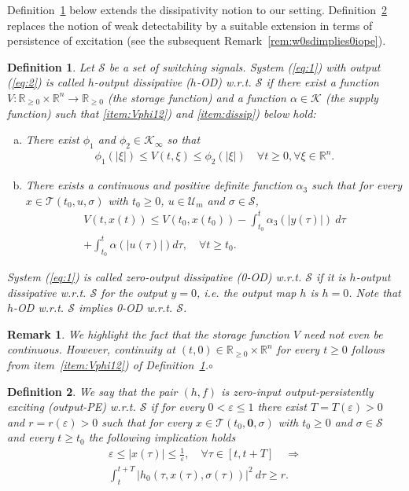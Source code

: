 \documentclass[9pt,final,journal]{IEEEtran}
\newtheorem{defin}{Definition}
\newtheorem{remark}{Remark}
\def\K{\mathcal{K}}
\def\Ki{\K_{\infty}}
\def\R{\mathbb{R}}
\def\S{\mathcal{S}}
\def\T{\mathcal{T}}
\def\U{\mathcal{U}}
\def\mer{\hfill $\circ$}
\begin{document}
Definition~\ref{def:hOD} below extends the dissipativity notion to our setting. Definition~\ref{def:0iope} replaces the notion of weak detectability by a suitable extension in terms of persistence of excitation (see the subsequent Remark~\ref{rem:w0sdimplies0iope}).
\begin{defin} 
  \label{def:hOD}
  Let $\S$ be a set of switching signals. System (\ref{eq:1}) with output (\ref{eq:2}) is called $h$-output dissipative ($h$-OD) w.r.t. $\S$ if there exist a function $V : \R_{\ge 0} \times \R^n \to \R_{\ge 0}$ (the storage function) and a function $\alpha\in\K$ (the supply function) such that \ref{item:Vphi12}) and \ref{item:dissip}) below hold:
  \begin{enumerate}[a)] 
   \item \label{item:Vphi12}There exist $\phi_1$ and $\phi_2\in\Ki$ so that
  \begin{align}
    \label{eq:Vphi12}
    \phi_1(|\xi|) \le V(t,\xi) \le \phi_2(|\xi|) \quad \forall t\ge 0, \forall \xi\in\R^n.
    \end{align}
  \item \label{item:dissip}There exists a continuous and positive definite function $\alpha_3$ such that  
  for every $x\in \T(t_0,u,\sigma)$ with $t_0\ge 0$, $u\in \U_m$ and $\sigma\in \S$,
 \begin{multline}
    V(t,x(t)) \le V(t_0,x(t_0))
   -\int_{t_0}^t \alpha_3(|y(\tau)|)\:d\tau\\
    \label{eq:hOD}
   + \int_{t_0}^t \alpha(|u(\tau)|) d\tau,
    \quad\forall t\ge t_0.
  \end{multline}
\end{enumerate}
System (\ref{eq:1}) is called zero-output dissipative (0-OD) w.r.t. $\S$ if it is $h$-output dissipative w.r.t. $\S$ for the output $y=0$, i.e. the output map $h$ is $h=0$.
Note that $h$-OD w.r.t. $\S$ implies 0-OD w.r.t. $\S$. 
\end{defin}
\begin{remark}
  \label{rem:Vnotcont}
  We highlight the fact that the storage function $V$ need not even be continuous. However, continuity at $(t,0) \in \R_{\ge 0} \times \R^n$ for every $t\ge 0$ follows from item~\ref{item:Vphi12}) of Definition~\ref{def:hOD}.\mer
\end{remark}
\begin{defin} 
  \label{def:0iope}
  We say that the pair $(h,f)$ is zero-input output-persistently exciting (output-PE) w.r.t. $\S$ if for every $0<\varepsilon\le 1$ there exist $T=T(\varepsilon)>0$ and  $r=r(\varepsilon)>0$ 
  such that for every $x \in \T(t_0,\mathbf{0},\sigma)$ with $t_0\ge 0$ and $\sigma\in \S$ and every $t\ge t_0$ the following implication holds
  \begin{multline} 
    \label{OPE}
    \varepsilon \le |x(\tau)| \le \frac{1}{\varepsilon}, \quad \forall \tau\in [t,t+T]\quad \Longrightarrow \\
    \int_{t}^{t+T} |h_0(\tau,x(\tau),\sigma(\tau))|^2\:d\tau \ge r. 
  \end{multline}
\end{defin}
\end{document}
